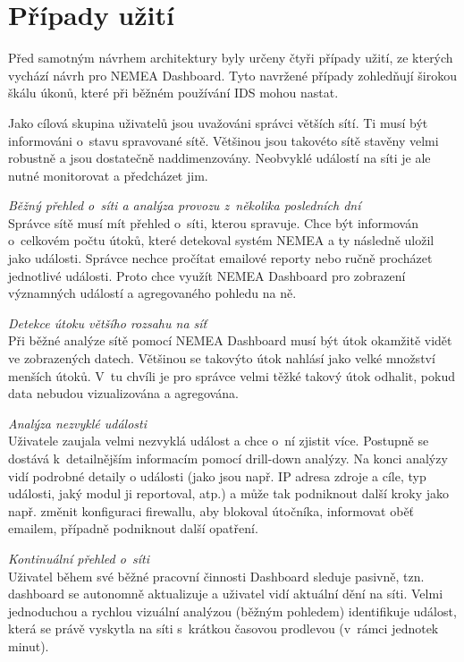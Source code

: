 \section{Případy užití}
Před samotným návrhem architektury byly určeny čtyři případy užití, ze kterých vychází návrh pro NEMEA Dashboard. Tyto navržené případy zohledňují širokou škálu úkonů, které při běžném používání IDS mohou nastat.

Jako cílová skupina uživatelů jsou uvažováni správci větších sítí. Ti musí být informováni o~stavu spravované sítě. Většinou jsou takovéto sítě stavěny velmi robustně a jsou dostatečně naddimenzovány. Neobvyklé událostí na síti je ale nutné monitorovat a předcházet jim.

\label{sec:aud}

\begin{description}
    \item \textit{Běžný přehled o~síti a analýza provozu z~několika posledních dní} \\
        Správce sítě musí mít přehled o~síti, kterou spravuje. Chce být informován o~celkovém počtu útoků, které detekoval systém NEMEA a ty následně uložil jako události. Správce nechce pročítat emailové reporty nebo ručně procházet jednotlivé události. Proto chce využít NEMEA Dashboard pro zobrazení významných událostí a agregovaného pohledu na ně.
    \item \textit{Detekce útoku většího rozsahu na síť} \\
        Při běžné analýze sítě pomocí NEMEA Dashboard musí být útok okamžitě vidět ve zobrazených datech. Většinou se takovýto útok nahlásí jako velké množství menších útoků. V~tu chvíli je pro správce velmi těžké takový útok odhalit, pokud data nebudou vizualizována a agregována.
    \item \textit{Analýza nezvyklé události} \\
        Uživatele zaujala velmi nezvyklá událost a chce o~ní zjistit více. Postupně se dostává k~detailnějším informacím pomocí drill-down analýzy. Na konci analýzy vidí podrobné detaily o události (jako jsou např. IP adresa zdroje a cíle, typ události, jaký modul ji reportoval, atp.) a může tak podniknout další kroky jako např. změnit konfiguraci firewallu, aby blokoval útočníka, informovat oběť emailem, případně podniknout další opatření.
    \item \textit{Kontinuální přehled o~síti} \\
        Uživatel během své běžné pracovní činnosti Dashboard sleduje pasivně, tzn. dashboard se autonomně aktualizuje a uživatel vidí aktuální dění na síti. Velmi jednoduchou a rychlou vizuální analýzou (běžným pohledem) identifikuje událost, která se právě vyskytla na síti s~krátkou časovou prodlevou (v~rámci jednotek minut).
        
\end{description}

